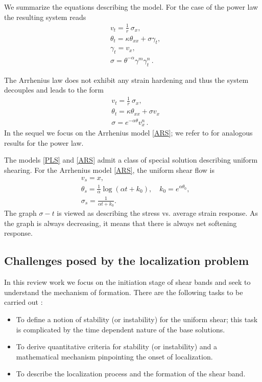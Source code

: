 \documentclass[a4paper,11pt]{article}
\newcommand{\sg}{\sigma}
\newcommand{\tht}{\theta}
\newcommand{\ga}{\alpha}
\theoremstyle{remark}
\begin{document}
We summarize the equations describing the model. For the case of the power law
the resulting system reads
\begin{equation}
  \label{PLS}
  \begin{aligned}
    & v_{t} = \frac{1}{r}\ \sigma_{x},\\
    & \theta_{t} = \kappa \theta_{ x x}  +  \sigma \gamma_{t}, \\
    & \gamma_{t} = v_{x},  \\
    & \sigma  = \theta^{-\alpha}\gamma^{m}\gamma_{t}^n \, .
  \end{aligned}
\end{equation}


The Arrhenius law does not exhibit any strain hardening and thus the system decouples and
leads to the form
\begin{equation}
  \label{ARS}
  \begin{aligned}
    & v_{t} = \frac{1}{r}\ \sigma_{x},\\
    & \theta_{t} = \kappa \theta_{ x x}  +  \sigma v_x \\
    & \sigma  = e^{-\ga\theta} v_x^n \, .
  \end{aligned}
\end{equation}
In the sequel we focus on the Arrhenius model \eqref{ARS}; we refer to \cite{KT,KT2} for analogous results
for the power law.


The models \eqref{PLS} and \eqref{ARS} admit a class of special solution describing 
uniform shearing. For the Arrhenius model \eqref{ARS}, the uniform shear flow is
\begin{equation} \label{ARUSS}
\begin{aligned}
& v_s = x, \\
& \tht_s= \frac{1}{\ga} \log{\left(\ga t + k_0\right)}, \quad   k_0 = e^{\ga\tht_0},\\
& \sg_s =  \frac{1}{\ga t + k_0}.
\end{aligned}
\end{equation}
The graph $\sigma - t$  is viewed as describing the stress vs. average strain response. As the
graph is always decreasing, it means that  there is always net softening response.



\subsection{Challenges posed by the localization problem}
In this review work we focus on the initiation stage of shear bands and seek to understand the
mechanism of formation.
There are the following tasks to be carried out :
\begin{itemize}
\item To define a notion of stability (or instability) for the uniform shear; this task is complicated
by the time dependent nature of the base solutions.
\item To derive quantitative criteria for stability (or instability) and a mathematical mechanism pinpointing the onset of localization.
\item To describe the localization process and the formation of the shear band.
\end{itemize}
\end{document}
